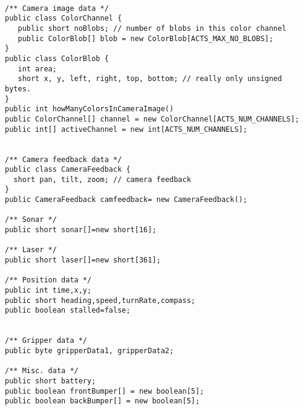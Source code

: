 \documentclass[11pt]{article}
\begin{document}
\begin{verbatim}

/** Camera image data */
public class ColorChannel {
   public short noBlobs; // number of blobs in this color channel
   public ColorBlob[] blob = new ColorBlob[ACTS_MAX_NO_BLOBS];
}
public class ColorBlob {
   int area;
   short x, y, left, right, top, bottom; // really only unsigned bytes.
}
public int howManyColorsInCameraImage()
public ColorChannel[] channel = new ColorChannel[ACTS_NUM_CHANNELS];
public int[] activeChannel = new int[ACTS_NUM_CHANNELS];


/** Camera feedback data */
public class CameraFeedback {
  short pan, tilt, zoom; // camera feedback 
}
public CameraFeedback camfeedback= new CameraFeedback();

/** Sonar */
public short sonar[]=new short[16];

/** Laser */
public short laser[]=new short[361];

/** Position data */
public int time,x,y;
public short heading,speed,turnRate,compass;
public boolean stalled=false;


/** Gripper data */
public byte gripperData1, gripperData2;

/** Misc. data */
public short battery;
public boolean frontBumper[] = new boolean[5];
public boolean backBumper[] = new boolean[5];
\end{verbatim}
\end{document}
